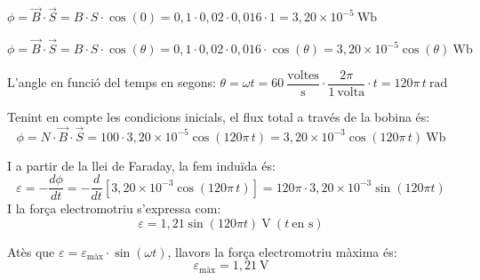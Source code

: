 \begin{solapartat}
 $\phi = \vec{B}\cdot\vec{S} = B\cdot S\cdot\cos(0) = 0,1\cdot 0,02\cdot 0,016\cdot 1 = 3,20\times 10^{-5}\ \mathrm{Wb}$

 $\phi = \vec{B}\cdot\vec{S} = B\cdot S\cdot\cos(\theta) = 0,1\cdot 0,02\cdot 0,016\cdot\cos(\theta) = 3,20\times 10^{-5}\cos(\theta)\ \mathrm{Wb}$
\end{solapartat}

\begin{solapartat}
 L'angle en funció del temps en segons: $\theta = \omega t = 60\ \dfrac{\text{voltes}}{\text{s}}\cdot\dfrac{2\pi}{1\ \text{volta}}\cdot t = 120\pi\, t\ \mathrm{rad}$

 Tenint en compte les condicions inicials, el flux total a través de la bobina és:
\[ \phi = N\cdot\vec{B}\cdot\vec{S} = 100\cdot 3,20\times 10^{-5}\cos(120\pi\, t) = 3,20\times 10^{-3}\cos(120\pi\, t)\ \mathrm{Wb} \]

 I a partir de la llei de Faraday, la fem induïda és:
\[ \varepsilon = -\frac{d\phi}{dt} = -\frac{d}{dt}\left[3,20\times 10^{-3}\cos(120\pi\, t)\right] = 120\pi\cdot 3,20\times 10^{-3}\sin(120\pi t) \]
I la força electromotriu s'expressa com:
\[ \varepsilon = 1,21\sin(120\pi t)\ \mathrm{V}\ (t\ \text{en s}) \]

 Atès que $\varepsilon = \varepsilon_\text{màx}\cdot\sin(\omega t)$, llavors la força electromotriu màxima és:
\[ \varepsilon_\text{màx} = 1,21\ \mathrm{V} \]
\end{solapartat}
